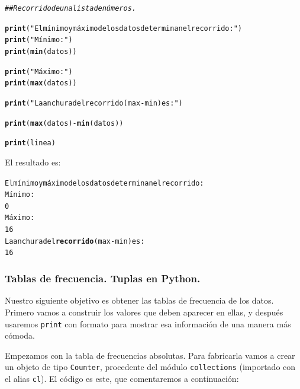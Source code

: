 \documentclass[10pt,a4paper]{article}\usepackage[]{graphicx}\usepackage[]{color}
\makeatletter
\newcommand{\hlstr}[1]{\textcolor[rgb]{0.192,0.494,0.8}{#1}}%
\newcommand{\hlcom}[1]{\textcolor[rgb]{0.678,0.584,0.686}{\textit{#1}}}%
\newcommand{\hlopt}[1]{\textcolor[rgb]{0,0,0}{#1}}%
\newcommand{\hlstd}[1]{\textcolor[rgb]{0.345,0.345,0.345}{#1}}%
\newcommand{\hlkwd}[1]{\textcolor[rgb]{0.737,0.353,0.396}{\textbf{#1}}}%
\newenvironment{kframe}{%
 \def\at@end@of@kframe{}%
 \ifinner\ifhmode%
  \def\at@end@of@kframe{\end{minipage}}%
  \begin{minipage}{\columnwidth}%
 \fi\fi%
 \def\FrameCommand##1{\hskip\@totalleftmargin \hskip-\fboxsep
 \colorbox{shadecolor}{##1}\hskip-\fboxsep
     \hskip-\linewidth \hskip-\@totalleftmargin \hskip\columnwidth}%
 \MakeFramed {\advance\hsize-\width
   \@totalleftmargin\z@ \linewidth\hsize
   \@setminipage}}%
 {\par\unskip\endMakeFramed%
 \at@end@of@kframe}
\newenvironment{knitrout}{}{} %
\newcounter {cont01}
\makeatother
\begin{document}
\begin{knitrout}
\color{fgcolor}\begin{kframe}
\begin{alltt}
\hlcom{## Recorrido de una lista de números.  }

\hlkwd{print}\hlstd{(}\hlstr{"El mínimo y máximo de los datos determinan el recorrido:"}\hlstd{)}
\hlkwd{print}\hlstd{(}\hlstr{"Mínimo:"}\hlstd{)}
\hlkwd{print}\hlstd{(}\hlkwd{min}\hlstd{(datos))}

\hlkwd{print}\hlstd{(}\hlstr{"Máximo:"}\hlstd{)}
\hlkwd{print}\hlstd{(}\hlkwd{max}\hlstd{(datos))}

\hlkwd{print}\hlstd{(}\hlstr{"La anchura del recorrido (max - min) es:"}\hlstd{)}

\hlkwd{print}\hlstd{(}\hlkwd{max}\hlstd{(datos)} \hlopt{-} \hlkwd{min}\hlstd{(datos))}

\hlkwd{print}\hlstd{(linea)}
\end{alltt}
\end{kframe}
\end{knitrout}

El resultado es:
\begin{knitrout}
\color{fgcolor}\begin{kframe}
\begin{alltt}
El mínimo y máximo de los datos determinan el recorrido:
Mínimo:
0
Máximo:
16
La anchura del \hlkwd{recorrido} (max - min) es:
16
\end{alltt}
\end{kframe}
\end{knitrout}

\subsubsection*{Tablas de frecuencia. Tuplas en Python.}
\label{tut02:subsubsec:tablasFrecuenciaTuplas}

Nuestro siguiente objetivo es obtener las tablas de frecuencia de los datos. Primero vamos a construir los valores que deben aparecer en ellas, y después usaremos {\tt print} con formato para mostrar esa información de una manera más cómoda.

Empezamos con la tabla de frecuencias absolutas. Para fabricarla vamos a crear un objeto  de tipo {\tt Counter}, procedente del módulo {\tt collections} (importado con el alias {\tt cl}). El código es este, que comentaremos a continuación:
\end{document}
